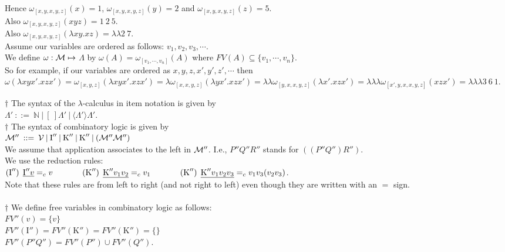 \documentclass[11pt]{article}
\begin{document}
Hence $\omega_{[x, y, x,y,z]}(x) = 1$, $\omega_{[x, y, x,y,z]}(y) = 2$ and $\omega_{[x, y, x,y,z]}(z) = 5$.\\
Also $\omega_{[x, y, x,y,z]}(xyz) = 1\:2\:5$.\\
Also $\omega_{[x, y, x,y,z]}(\lambda xy.xz) = \lambda \lambda 2\:7$.\\

Assume our variables are ordered as follows: $v_1, v_2, v_3, \cdots$.\\
We define $\omega : {\cal M} \mapsto$ $\Lambda$
by $\omega(A) = \omega_{[v_1,\cdots, v_n]}(A)$ where 
$FV(A) \subseteq \{v_1,\cdots,v_n\}$.\\
So for example, if our variables are ordered as $x,y,z,x',y',z', \cdots$ then $\omega(\lambda xyx'.xzx')
= \omega_{[x,y,z]}(\lambda xyx'.xzx') = \lambda\omega_{[x,x,y,z]}(\lambda yx'.xzx') = \lambda\lambda\omega_{[y,x,x,y,z]}(\lambda x'.xzx') = \lambda\lambda\lambda\omega_{[x',y,x,x,y,z]}(xzx') = \lambda\lambda\lambda 3\:6\:1$.


$\dagger$ The syntax of the $\lambda$-calculus in item notation is given by\\
$\Lambda'  \: ::=  \:  {\mathbb{N}} \:|\: [\:]{\Lambda'} \:|\: \langle \Lambda' \rangle \Lambda'$.\\

$\dagger$ The syntax of combinatory logic is given by\\
${\cal M}''  \: ::=  \:  {\cal V} \:|\: \mbox{I}'' \:|\: \mbox{K}'' \:|\:\mbox{K}''\:|\: ({\cal M}''{\cal M}'')$\\
We assume that application associates to the left in ${\cal M}''$. I.e., $P''Q''R''$ stands for $((P''Q'')R'')$.\\
We use  the reduction rules: \\
$(\mbox{I}'') \: \:  \underline{\mbox{I}'' v} =_c v \hspace{0.5in} (\mbox{K}'') \: \:  \underline{\mbox{K}'' v_1v_2} =_c v_1 \hspace{0.5in} (\mbox{K}'') \:\:   \underline{\mbox{K}'' v_1v_2v_3} =_c v_1v_3(v_2v_3)$.\\
Note that these rules are from left to right (and not right to left) even though they are written with an $=$ sign.\\
\\
$\dagger$ 
We define free variables in combinatory logic as follows:\\
$FV''(v) = \{v\}$\\
$FV''(\mbox{I}'') = FV''(\mbox{K}'') = FV''(\mbox{K}'') = \{\}$\\ $FV''(P''Q'') = FV''(P'')\cup FV''(Q'')$.
\end{document}
